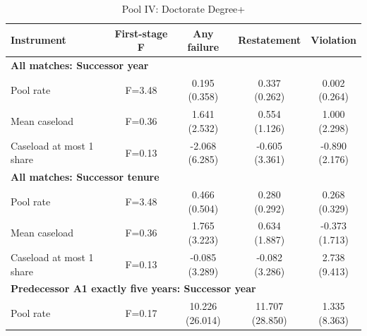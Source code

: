 \begin{table}[htbp]
\footnotesize
\def\sym#1{\ifmmode^{#1}\else\(^{#1}\)\fi}
\centering
\caption{Pool IV: Doctorate Degree+}
\begin{threeparttable}
\begin{tabular}{p{}cccc}
\toprule
Instrument & First-stage F & Any failure & Restatement & Violation \\
\midrule
\multicolumn{5}{l}{\textbf{All matches: Successor year}} \\
Pool rate & F=3.48 & \shortstack{0.195\\(0.358)} & \shortstack{0.337\\(0.262)} & \shortstack{0.002\\(0.264)} \\
Mean caseload & F=0.36 & \shortstack{1.641\\(2.532)} & \shortstack{0.554\\(1.126)} & \shortstack{1.000\\(2.298)} \\
Caseload at most 1 share & F=0.13 & \shortstack{-2.068\\(6.285)} & \shortstack{-0.605\\(3.361)} & \shortstack{-0.890\\(2.176)} \\
\multicolumn{5}{l}{\textbf{All matches: Successor tenure}} \\
Pool rate & F=3.48 & \shortstack{0.466\\(0.504)} & \shortstack{0.280\\(0.292)} & \shortstack{0.268\\(0.329)} \\
Mean caseload & F=0.36 & \shortstack{1.765\\(3.223)} & \shortstack{0.634\\(1.887)} & \shortstack{-0.373\\(1.713)} \\
Caseload at most 1 share & F=0.13 & \shortstack{-0.085\\(3.289)} & \shortstack{-0.082\\(3.286)} & \shortstack{2.738\\(9.413)} \\
\multicolumn{5}{l}{\textbf{Predecessor A1 exactly five years: Successor year}} \\
Pool rate & F=0.17 & \shortstack{10.226\\(26.014)} & \shortstack{11.707\\(28.850)} & \shortstack{1.335\\(8.363)} \\

\end{tabular}
\end{threeparttable}
\end{table}
